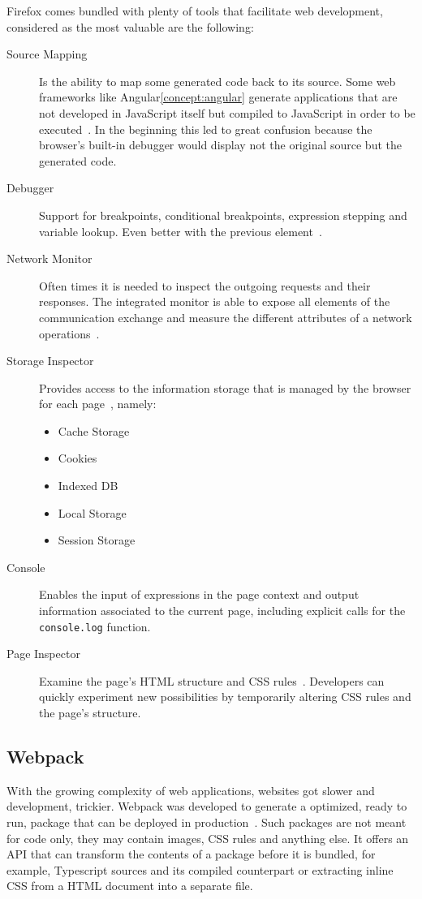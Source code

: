 Firefox comes bundled with plenty of tools that facilitate web development, considered as the most valuable are the following:
\begin{description}
\item [Source Mapping] Is the ability to map some generated code back to its source. Some web frameworks like Angular\ref{concept:angular} generate applications that are not developed in JavaScript itself but compiled to JavaScript in order to be executed~\cite{srcmapping}. In the beginning this led to great confusion because the browser's built-in debugger would display not the original source but the generated code.
\item [Debugger] Support for breakpoints, conditional breakpoints, expression stepping and variable lookup. Even better with the previous element~\cite{dbgmodernweb}.
\item [Network Monitor] Often times it is needed to inspect the outgoing requests and their responses. The integrated monitor is able to expose all elements of the communication exchange and measure the different attributes of a network operations~\cite{networkmon}.
\item [Storage Inspector] Provides access to the information storage that is managed by the browser for each page~\cite{storageinspector}, namely:
  \begin{itemize}
  \item Cache Storage
  \item Cookies
  \item Indexed \gls{DB}
  \item Local Storage
  \item Session Storage
  \end{itemize}
\item [Console] Enables the input of expressions in the page context and output information associated to the current page, including explicit calls for the \texttt{console.log} function.
\item [Page Inspector] Examine the page's \gls{HTML} structure and \gls{CSS} rules~\cite{inspector}. Developers can quickly experiment new possibilities by temporarily altering \gls{CSS} rules and the page's structure.
\end{description}

\subsection{Webpack}
With the growing complexity of web applications, websites got slower and development, trickier. Webpack was developed to generate a optimized, ready to run, package that can be deployed in production~\cite{webpack}. Such packages are not meant for code only, they may contain images, \gls{CSS} rules and anything else. It offers an \gls{API} that can transform the contents of a package before it is bundled, for example, Typescript sources and its compiled counterpart or extracting inline \gls{CSS} from a \gls{HTML} document into a separate file.


